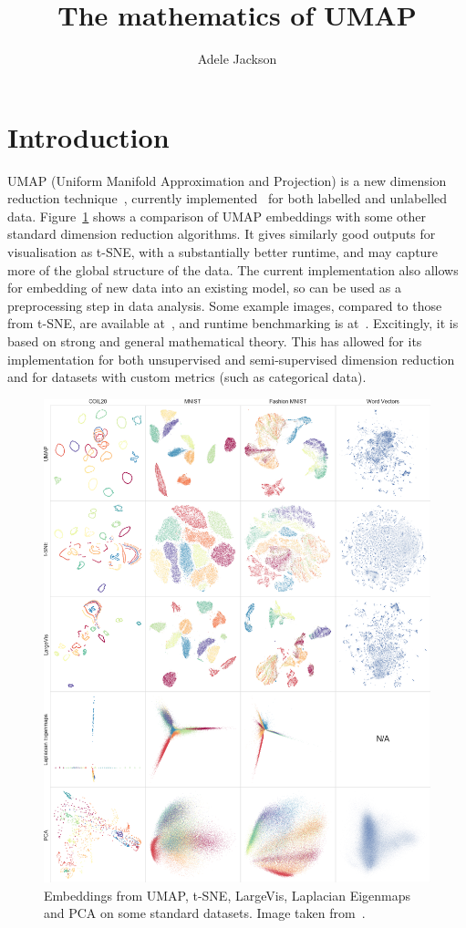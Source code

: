 \documentclass[a4paper,11pt,leqno]{article}
\title{The mathematics of UMAP}
\author{Adele Jackson}
\theoremstyle{definition}
\begin{document}
\thispagestyle{empty}
\maketitle


\section{Introduction}
UMAP (Uniform Manifold Approximation and Projection) is a new dimension reduction technique~\cite{McInnes18}, currently implemented~\cite{McInnesGithub, MelvilleGithub} for both labelled and unlabelled data.
Figure~\ref{fig_example_embedding} shows a comparison of UMAP embeddings with some other standard dimension reduction algorithms.
It gives similarly good outputs for visualisation as t-SNE, with a substantially better runtime, and may capture more of the global structure of the data.
The current implementation also allows for embedding of new data into an existing model, so can be used as a preprocessing step in data analysis.
Some example images, compared to those from t-SNE, are available at~\cite{Melville}, and runtime benchmarking is at~\cite{McInnesBenchmarking}.
Excitingly, it is based on strong and general mathematical theory.
This has allowed for its implementation for both unsupervised and semi-supervised dimension reduction and for datasets with custom metrics (such as categorical data).

\begin{figure}
	\centering
	\includegraphics[width=1.05\textwidth]{figures/dim-red-comparison-nips.png}
	\caption{Embeddings from UMAP, t-SNE, LargeVis, Laplacian Eigenmaps and PCA on some standard datasets. Image taken from~\cite{McInnes18}.}
	\label{fig_example_embedding}
\end{figure}
\end{document}
